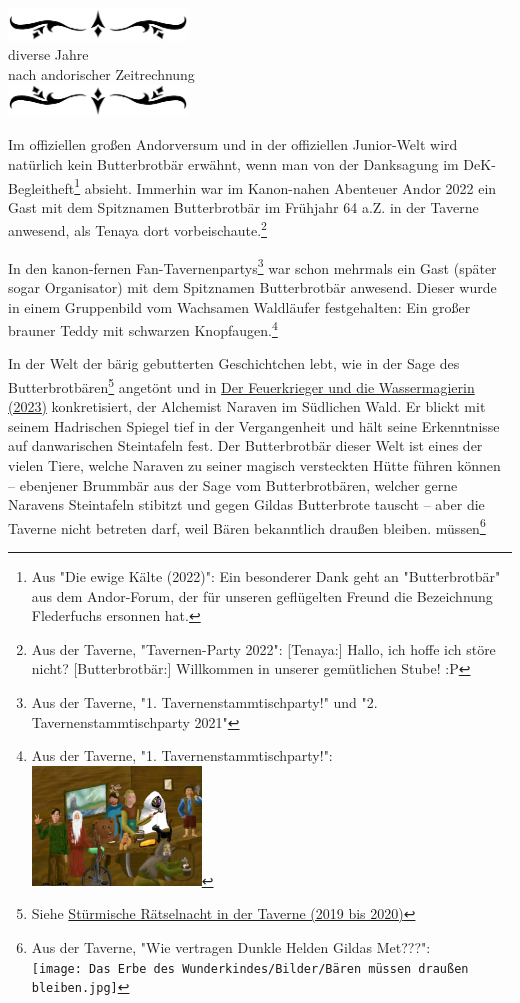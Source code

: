 \documentclass[10pt, a4paper, oneside]{book}
\newcommand{\hypref}[1]{%
    \hyperref[#1]{#1}%
}
\newcommand{\az}[1]{%
    \begin{center}
        \includegraphics[width=180px]{Das Erbe des Wunderkindes/verzierung1.png}\\
        {\Huge #1} \\
        {nach andorischer Zeitrechnung}\\
        \includegraphics[width=180px]{Das Erbe des Wunderkindes/verzierung2.png}
    \end{center}
    \extramarks{}{#1 a.Z.}
}
\begin{document}
\az{diverse Jahre}

{\parindent0pt

Im offiziellen großen Andorversum und in der offiziellen Junior-Welt wird natürlich kein Butterbrotbär erwähnt, wenn man von der Danksagung im DeK-Begleitheft\footnote{Aus "Die ewige Kälte (2022)": Ein besonderer Dank geht an "Butterbrotbär" aus dem Andor-Forum, der für unseren geflügelten Freund die Bezeichnung Flederfuchs ersonnen hat.} absieht. Immerhin war im Kanon-nahen Abenteuer Andor 2022 ein Gast mit dem Spitznamen Butterbrotbär im Frühjahr 64 a.Z. in der Taverne anwesend, als Tenaya dort vorbeischaute.\footnote{Aus der Taverne, "Tavernen-Party 2022": [Tenaya:] Hallo, ich hoffe ich störe nicht? [Butterbrotbär:] Willkommen in unserer gemütlichen Stube! :P}\newpage


In den kanon-fernen Fan-Tavernenpartys\footnote{Aus der Taverne, "1. Tavernenstammtischparty!" und "2. Tavernenstammtischparty 2021"} war schon mehrmals ein Gast (später sogar Organisator) mit dem Spitznamen Butterbrotbär anwesend. Dieser wurde in einem Gruppenbild vom Wachsamen Waldläufer festgehalten: Ein großer brauner Teddy mit schwarzen Knopfaugen.\footnote{Aus der Taverne, "1. Tavernenstammtischparty!":\\\includegraphics[height=120px]{Das Erbe des Wunderkindes/Bilder/Tavernenstammtischparty 2020 Gruppenbild.jpg}}\bigskip


In der Welt der bärig gebutterten Geschichtchen lebt, wie in der Sage des Butterbrotbären\footnote{Siehe \hypref{Stürmische Rätselnacht in der Taverne (2019 bis 2020)}} angetönt und in \hypref{Der Feuerkrieger und die Wassermagierin (2023)} konkretisiert, der Alchemist Naraven im Südlichen Wald. Er blickt mit seinem Hadrischen Spiegel tief in der Vergangenheit und hält seine Erkenntnisse auf danwarischen Steintafeln fest. Der Butterbrotbär dieser Welt ist eines der vielen Tiere, welche Naraven zu seiner magisch versteckten Hütte führen können – ebenjener Brummbär aus der Sage vom Butterbrotbären, welcher gerne Naravens Steintafeln stibitzt und gegen Gildas Butterbrote tauscht – aber die Taverne nicht betreten darf, weil Bären bekanntlich draußen bleiben. müssen\footnote{ Aus der Taverne, "Wie vertragen Dunkle Helden Gildas Met???":\\\texttt{[image: Das Erbe des Wunderkindes/Bilder/Bären müssen draußen bleiben.jpg]}}\bigskip



}
\end{document}

